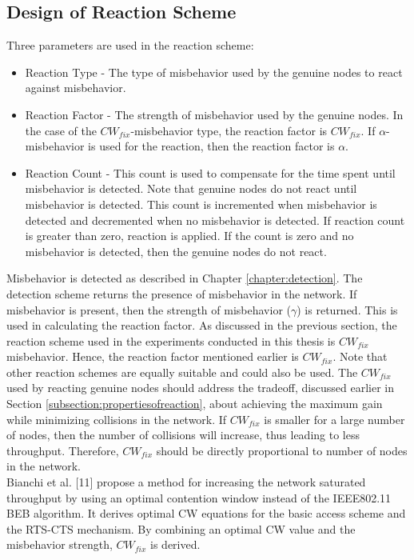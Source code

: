 \documentclass[12pt,letterpaper,english]{article}
\begin{document}
\subsection{Design of Reaction Scheme} 
\label{subsection:reactiondesign} 
\indent Three parameters are used in the reaction scheme:
\begin{itemize}
\item Reaction Type - The type of misbehavior used by the genuine nodes to react against misbehavior.
\item Reaction Factor - The strength of misbehavior used by the genuine nodes. In the case of the $CW_{fix}$-misbehavior type, the reaction factor is $CW_{fix}$. If $\alpha$-misbehavior is used for the reaction, then the reaction factor is $\alpha$.
\item Reaction Count - This count is used to compensate for the time spent until misbehavior is detected. Note that genuine nodes do not react until misbehavior is detected. This count is incremented when misbehavior is detected and decremented when no misbehavior is detected. If reaction count is greater than zero, reaction is applied. If the count is zero and no misbehavior is detected, then the genuine nodes do not react. 
\end{itemize}
Misbehavior is detected as described in Chapter \ref{chapter:detection}. The detection scheme returns the presence of misbehavior in the network. If misbehavior is present, then the strength of misbehavior ($\gamma$) is returned. This is used in calculating the reaction factor.
As discussed in the previous section, the reaction scheme used in the experiments conducted in this thesis is $CW_{fix}$ misbehavior. Hence, the reaction factor mentioned earlier is $CW_{fix}$. Note that other reaction schemes are equally suitable and could also be used. The $CW_{fix}$ used by reacting genuine nodes should address the tradeoff, discussed earlier in Section \ref{subsection:propertiesofreaction}, about achieving the maximum gain while minimizing collisions in the network. If $CW_{fix}$ is smaller for a large number of nodes, then the number of collisions will increase, thus leading to less throughput. Therefore, $CW_{fix}$ should be directly proportional to number of nodes in the network.
\\
\indent Bianchi et al. 
[11] 
propose a method for increasing the network saturated throughput by using an optimal contention window instead of the IEEE802.11 BEB algorithm. It derives optimal CW equations for the basic access scheme and the RTS-CTS mechanism. By combining an optimal CW value and the misbehavior strength, $CW_{fix}$ is derived.
\end{document}
